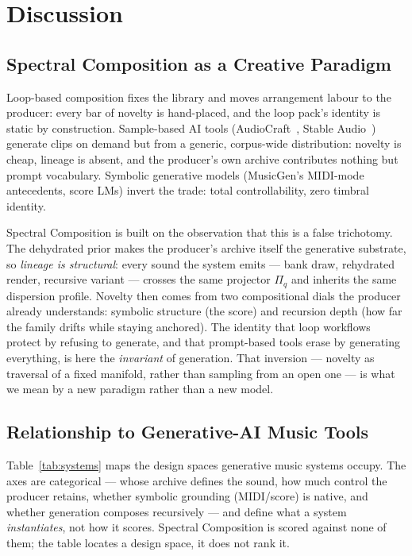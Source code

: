 \documentclass[12pt,a4paper]{article}
\begin{document}
\section{Discussion}
\label{sec:discussion}

\subsection{Spectral Composition as a Creative Paradigm}
\label{subsec:disc_paradigm}

Loop-based composition fixes the library and moves arrangement labour
to the producer: every bar of novelty is hand-placed, and the loop
pack's identity is static by construction. Sample-based AI tools
(AudioCraft~\cite{audiocraft2023}, Stable
Audio~\cite{stableaudio2023}) generate clips on demand but from a
generic, corpus-wide distribution: novelty is cheap, lineage is absent,
and the producer's own archive contributes nothing but prompt
vocabulary. Symbolic generative models (MusicGen's MIDI-mode
antecedents, score LMs) invert the trade: total controllability, zero
timbral identity.

Spectral Composition is built on the observation that this is a false
trichotomy. The dehydrated prior makes the producer's archive itself
the generative substrate, so \emph{lineage is structural}: every sound
the system emits — bank draw, rehydrated render, recursive variant —
crosses the same projector $\Pi_q$ and inherits the same dispersion
profile. Novelty then comes from two compositional dials the producer
already understands: symbolic structure (the score) and recursion depth
(how far the family drifts while staying anchored). The identity that
loop workflows protect by refusing to generate, and that prompt-based
tools erase by generating everything, is here the \emph{invariant} of
generation. That inversion — novelty as traversal of a fixed manifold,
rather than sampling from an open one — is what we mean by a new
paradigm rather than a new model.

\subsection{Relationship to Generative-AI Music Tools}
\label{subsec:disc_related}

Table~\ref{tab:systems} maps the design spaces generative music systems
occupy. The axes are categorical — whose archive defines the sound, how
much control the producer retains, whether symbolic grounding
(MIDI/score) is native, and whether generation composes recursively —
and define what a system \emph{instantiates}, not how it scores.
Spectral Composition is scored against none of them; the table locates
a design space, it does not rank it.
\end{document}
